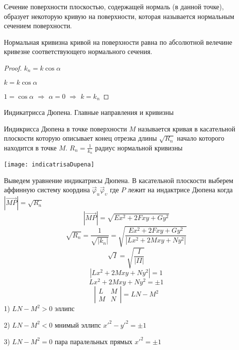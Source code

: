 \begin{define}
  Сечение поверхности плоскостью, содержащей нормаль (в данной точке), образует
  некоторую кривую на поверхности, которая называется нормальным сечением
  поверхности.
\end{define}

\begin{theorem}
  Нормальная кривизна кривой на поверхности равна по абсолютной велечине
  кривезне соответствующего нормального сечения.
\end{theorem}

\begin{proof}
  $k_n = k \cos \alpha$

  $k = k \cos \alpha$

  $1 = \cos \alpha$ $\Rightarrow$ $\alpha = 0$ $\Rightarrow$ $k=k_n$
\end{proof}

\begin{title}[\Large]
  Индикатрисса Дюпена. Главные направления и кривизны
\end{title}

\begin{define}
  Индикрисса Дюпена в точке поверхности $M$ называется кривая в касательной
  плоскости которую описывает конец отрезка длины $\sqrt{R_n}$ начало
  которого находится в точке $M$. $R_n = \frac{1}{k_n}$ радиус нормальной
  кривизны

  \texttt{[image: indicatrisaDupena]}
\end{define}

\begin{block}
  Выведем уравнение индикатрисы Дюпена. В касательной плоскости выберем аффинную
  систему координа $\vec \varphi_u \vec \varphi_{\upsilon}$ где $P$ лежит на
  индактрисе Дюпена когда $|\overrightarrow{MP}| = \sqrt{R_n}$
  $$
  |\overrightarrow{MP}| = \sqrt{Ex^2 + 2Fxy + Gy^2}
  $$
  $$
  \sqrt{R_n} = \frac{1}{\sqrt{|k_n|}} = \sqrt{\frac{Ex^2 + 2Fxy + Gy^2}{
  |Lx^2 + 2Mxy + Ny^2|}}
  $$
  $$\sqrt{I} = \sqrt{\frac{I}{|II|}}
  $$
  $$
  |Lx^2 + 2Mxy + Ny^2| = 1
  $$
  $$
  Lx^2 + 2Mxy + Ny^2 = \pm 1
  $$
  $$
  \left|
  \begin{array}{cc}
    L & M \\
    M & N
  \end{array}
  \right| = LN - M^2
  $$
  1) $LN - M^2 > 0$ эллипс

  2) $LN - M^2 < 0$ мнимый эллипс $x'^2 - y'^2 = \pm 1$

  3) $LN - M^2 = 0$ пара паралельных прямых $x'^2 = \pm 1$
\end{block}

